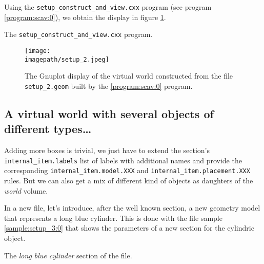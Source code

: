 Using   the   \texttt{setup\_construct\_and\_view.cxx}  program   (see
program  \ref{program:scav:0}),  we   obtain  the  display  in  figure
\ref{fig:setup_2:0}.

\begin{program}[hp]
\caption{The \texttt{setup\_construct\_and\_view.cxx} program.}
\label{program:scav:0}
\end{program}

\begin{figure}[h]
\begin{center}
\texttt{[image: \\imagepath/setup\_2.jpeg]}
\end{center}
\caption{The Gnuplot  display of the  virtual world constructed
  from   the   file   \texttt{setup\_2.geom}  built   by   the
  \ref{program:scav:0} program.}\label{fig:setup_2:0}
\end{figure}


\clearpage

\subsection{A virtual world with several objects of different types\dots}

Adding more  boxes is trivial, we  just have to  extend the 
section's   \texttt{internal\_item.labels}   list   of   labels   with
additional      names      and      provide     the      corresponding
\texttt{internal\_item.model.XXX}                                   and
\texttt{internal\_item.placement.XXX}  rules.  But we  can also  get a
mix  of different  kind of  objects as  daughters of  the \emph{world}
volume.

In  a new    file, let's  introduce,  after the
well known   section,  a new  geometry  model that
represents a  long blue cylinder.  This  is done with  the file sample
\ref{sample:setup_3:0} that shows the  parameters of a new section for
the cylindric object.

\begin{sample}[h]
\caption{The \emph{long blue cylinder}
  section of the   file.}
\label{sample:setup_3:0}
\end{sample}

